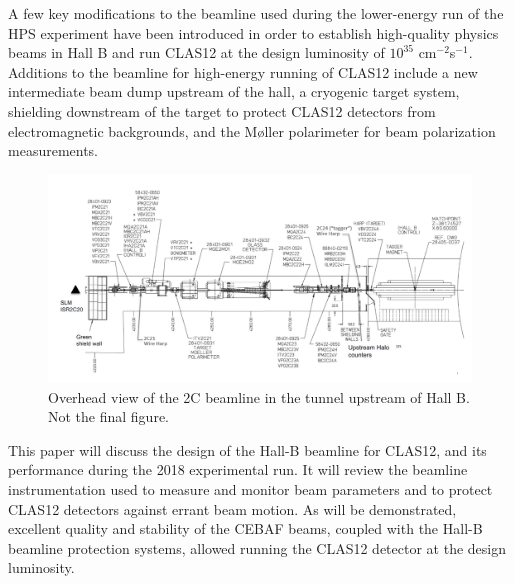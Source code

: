 A few key modifications to the beamline \cite{HPSBeamline} used during the lower-energy run of the HPS experiment have been introduced 
in order to establish high-quality physics beams in Hall B and run CLAS12 at the design luminosity of $10^{35}$ cm$^{-2}$s$^{-1}$.  
Additions to the beamline for high-energy running of CLAS12 include a new intermediate beam dump upstream of the hall, a cryogenic 
target system, shielding downstream of the target to protect CLAS12 detectors from electromagnetic backgrounds, and the M{\o}ller 
polarimeter for beam polarization measurements.   

\begin{figure}[t]
\begin{center}
\includegraphics[width=1.\textwidth]{upstream_tunnel.pdf}
\caption{Overhead view of the 2C beamline in the tunnel upstream of Hall B. {\color{red} Not the final figure.}}
\label{fig:upstream}
\end{center}
\end{figure}

 
This paper will discuss the design of the Hall-B beamline for CLAS12, and its performance during the 2018 experimental run. It will review the 
beamline instrumentation used to measure and monitor beam parameters and to protect CLAS12 detectors against errant beam motion. As will 
be demonstrated, excellent quality and stability of the CEBAF beams, coupled with the Hall-B beamline protection systems, allowed running the 
CLAS12 detector at the design luminosity.


